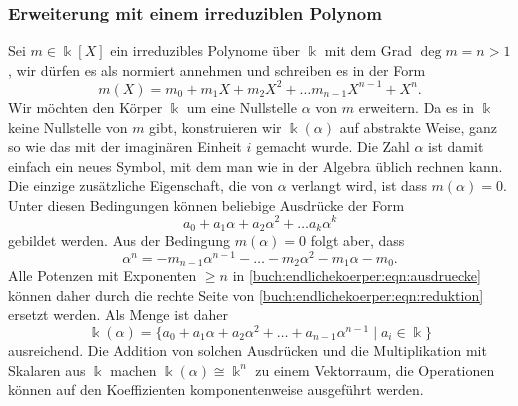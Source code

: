 \subsubsection{Erweiterung mit einem irreduziblen Polynom}
Sei $m\in\Bbbk[X]$ ein irreduzibles Polynome über $\Bbbk$ mit dem Grad
$\deg m=n>1$,
wir dürfen es als normiert annehmen und schreiben es in der Form
\[
m(X)
=
m_0+m_1X+m_2X^2 + \dots m_{n-1}X^{n-1}+X^n.
\]
Wir möchten den Körper $\Bbbk$ um eine Nullstelle $\alpha$ von $m$
erweitern.
Da es in $\Bbbk$ keine Nullstelle von $m$ gibt, konstruieren wir
$\Bbbk(\alpha)$ auf abstrakte Weise, ganz so wie das mit der imaginären
Einheit $i$ gemacht wurde.
Die Zahl $\alpha$ ist damit einfach ein neues Symbol, mit dem man
wie in der Algebra üblich rechnen kann.
Die einzige zusätzliche Eigenschaft, die von $\alpha$ verlangt wird,
ist dass $m(\alpha)=0$.
Unter diesen Bedingungen können beliebige Ausdrücke der Form
\begin{equation}
a_0 + a_1\alpha + a_2\alpha^2 + \dots a_k\alpha^k
\label{buch:endlichekoerper:eqn:ausdruecke}
\end{equation}
gebildet werden.
Aus der Bedingung $m(\alpha)=0$ folgt aber, dass
\begin{equation}
\alpha^n = -m_{n-1}\alpha^{n-1} -\dots - m_2\alpha^2  - m_1\alpha - m_0.
\label{buch:endlichekoerper:eqn:reduktion}
\end{equation}
Alle Potenzen mit Exponenten $\ge n$ in
\eqref{buch:endlichekoerper:eqn:ausdruecke}
können daher durch die rechte Seite von
\eqref{buch:endlichekoerper:eqn:reduktion}
ersetzt werden.
Als Menge ist daher
\[
\Bbbk(\alpha)
=
\{
a_0+a_1\alpha+a_2\alpha^2+\dots+a_{n-1}\alpha^{n-1}\;|\; a_i\in\Bbbk\}
\]
ausreichend.
Die Addition von solchen Ausdrücken und die Multiplikation mit Skalaren
aus $\Bbbk$ machen $\Bbbk(\alpha)\cong \Bbbk^n$ zu einem Vektorraum,
die Operationen können auf den Koeffizienten komponentenweise ausgeführt
werden.

